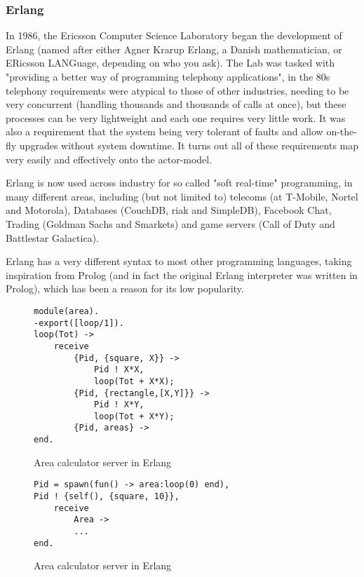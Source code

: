 \documentclass{article}
\begin{document}
\subsubsection{Erlang}

In 1986, the Ericsson Computer Science Laboratory began the development of
Erlang\cite{armstrong2007} (named after either Agner Krarup Erlang, a Danish
mathematician, or ERicsson LANGuage, depending on who you ask). The Lab was
tasked with "providing a better way of programming telephony applications", in
the 80s telephony requirements were atypical to those of other industries,
needing to be very concurrent (handling thousands and thousands of calls at
once), but these processes can be very lightweight and each one requires very
little work. It was also a requirement that the system being very tolerant of
faults and allow on-the-fly upgrades without system downtime. It turns out all
of these requirements map very easily and effectively onto the actor-model.

Erlang is now used across industry for so called "soft real-time" programming,
in many different areas, including (but not limited to) telecoms (at T-Mobile,
Nortel and Motorola), Databases (CouchDB, riak and SimpleDB), Facebook Chat,
Trading (Goldman Sachs and Smarkets) and game servers (Call of Duty and
Battlestar Galactica).

Erlang has a very different syntax to most other programming languages, taking
inspiration from Prolog (and in fact the original Erlang interpreter was written in
Prolog), which has been a reason for its low popularity.

\begin{figure}[H]
\begin{verbatim}
module(area).
-export([loop/1]).
loop(Tot) ->
    receive
        {Pid, {square, X}} ->
            Pid ! X*X,
            loop(Tot + X*X);
        {Pid, {rectangle,[X,Y]}} ->
            Pid ! X*Y,
            loop(Tot + X*Y);
        {Pid, areas} ->
end.
\end{verbatim}
\caption{Area calculator server in Erlang}
\label{fig:example_erlang_server}
\end{figure}

\begin{figure}[H]
\begin{verbatim}
Pid = spawn(fun() -> area:loop(0) end),
Pid ! {self(), {square, 10}},
    receive
        Area -> 
        ...
end.
\end{verbatim}
\caption{Area calculator server in Erlang}
\label{fig:example_erlang_client}
\end{figure}
\end{document}
